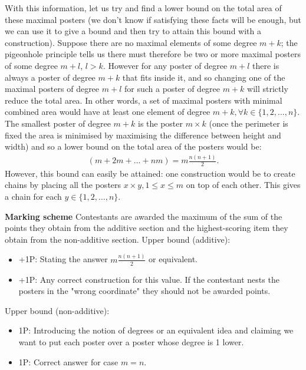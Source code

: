 {With this information, let us try and find a lower bound on the total area of these maximal posters (we don't know if satisfying these facts will be enough, but we can use it to give a bound and then try to attain this bound with a construction). Suppose there are no maximal elements of some degree $m+k$; the pigeonhole principle tells us there must therefore be two or more maximal posters of some degree $m+l$, $l > k$. However for any poster of degree $m+l$ there is always a poster of degree $m+k$ that fits inside it, and so changing one of the maximal posters of degree $m+l$ for such a poster of degree $m+k$ will strictly reduce the total area. In other words, a set of maximal posters with minimal combined area would have at least one element of degree $m+k,  \forall k \in \{1, 2, \dots , n\}$. The smallest poster of degree $m+k$ is the poster $m \times k$ (once the perimeter is fixed the area is minimised by maximising the difference between height and width) and so a lower bound on the total area of the posters would be:
\begin{align*}
    (m + 2m + \dots + nm) = m\frac{n(n+1)}{2}.
\end{align*}
However, this bound can easily be attained: one construction would be to create chains by placing all the posters $x \times y, 1 \le x \le m$ on top of each other. This gives a chain for each $y \in \{1, 2, \dots , n\}$.
\newpage

\textbf{Marking scheme}
Contestants are awarded the maximum of the sum of the points they obtain from the additive section and the highest-scoring item they obtain from the non-additive section. 
Upper bound (additive):
\begin{itemize}
\item +1P: Stating the answer $m\frac{n(n+1)}{2}$ or equivalent. 
\item +1P: Any correct construction for this value. If the contestant nests the posters in the "wrong coordinate" they should not be awarded points.
\end{itemize}

Upper bound (non-additive):
\begin{itemize}
    \item 1P: Introducing the notion of degrees or an equivalent idea and claiming we want to put each poster over a poster whose degree is 1 lower.
    \item 1P: Correct answer for case $m = n$.
\end{itemize}

}
